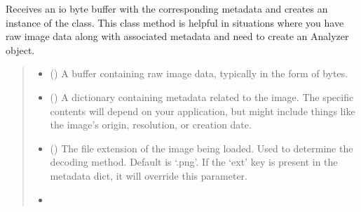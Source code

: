 \documentclass[letterpaper,10pt,english]{sphinxmanual}
\begin{document}
\begin{fulllineitems}
\begin{fulllineitems}
\end{fulllineitems}


\begin{fulllineitems}
\label{\detokenize{forensicfit.core.analyzer:forensicfit.core.analyzer.Analyzer.from_buffer}}
\pysigstartsignatures
{}
\pysigstopsignatures
\sphinxAtStartPar
Receives an io byte buffer with the corresponding metadata and
creates an instance of the class. This class method is helpful in
situations where you have raw image data along with associated metadata
and need to create an Analyzer object.
\begin{quote}\begin{description}
\begin{itemize}
\item {} 
\sphinxAtStartPar
{} () \textendash{} A buffer containing raw image data, typically in the form of bytes.

\item {} 
\sphinxAtStartPar
{} () \textendash{} A dictionary containing metadata related to the image. The specific
contents will depend on your application, but might include things
like the image’s origin, resolution, or creation date.

\item {} 
\sphinxAtStartPar
{} (\sphinxstyleliteralemphasis{\sphinxupquote{, }}) \textendash{} The file extension of the image being loaded. Used to determine
the decoding method. Default is ‘.png’. If the ‘ext’ key is present
in the metadata dict, it will override this parameter.

\end{itemize}

\sphinxAtStartPar
\begin{itemize}
\item {} 
\sphinxAtStartPar
{}


\end{itemize}
\end{description}
\end{quote}
\end{fulllineitems}
\end{fulllineitems}
\end{document}

